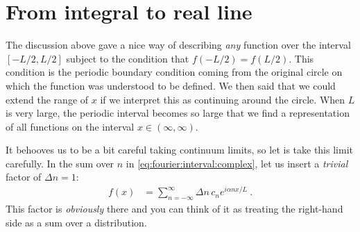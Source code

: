 \documentclass[12pt, oneside]{report}    %
\let\oldsection\section
\def\section{%
  \setcounter{sidenote}{1}%
  \oldsection
}
\begin{document}
\section{From integral to real line}
The discussion above gave a nice way of describing \emph{any} function over the interval $[-L/2, L/2]$ subject to the condition that $f(-L/2) = f(L/2)$. This condition is the periodic boundary condition coming from the original circle on which the function was understood to be defined. We then said that we could extend the range of $x$ if we interpret this as continuing around the circle. When $L$ is very large, the periodic interval becomes so large that we find a representation of all functions on the interval $x\in (\infty, \infty)$. 

It behooves us to be a bit careful taking continuum limits, so let is take this limit carefully. In the sum over $n$ in \eqref{eq:fourier:interval:complex}, let us insert a \emph{trivial} factor of $\Delta n = 1$:
\begin{align}
    f(x) &= \sum_{n=-\infty}^\infty \Delta n\, c_n e^{i\alpha n x/L} \ .
    \label{eq:toward:fourier:transform:discrete:sum}
\end{align}
This factor is \emph{obviously} there and you can think of it as treating the right-hand side as a sum over a distribution. 
\end{document}
